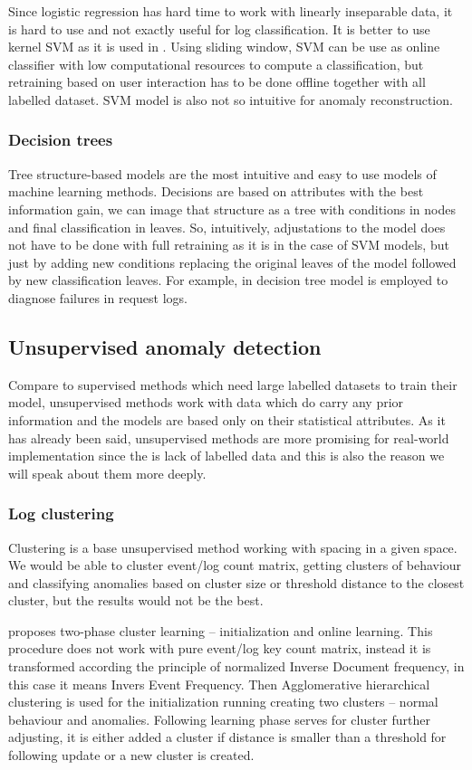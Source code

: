 Since logistic regression has hard time to work with linearly inseparable data, it is hard to use and not exactly useful for log classification. It is better to use kernel SVM as it is used in \cite{liang2007failure}.  Using sliding window, SVM can be use as online classifier with low computational resources to compute a classification, but retraining based on user interaction has to be done offline together with all labelled dataset. SVM model is also not so intuitive for anomaly reconstruction. 
\subsubsection{Decision trees}
Tree structure-based models are the most intuitive and easy to use models of machine learning methods. Decisions are based on attributes with the best information gain, we can image that structure as a tree with conditions in nodes and final classification in leaves. So, intuitively, adjustations to the model does not have to be done with full retraining as it is in the case of SVM models, but just by adding new conditions replacing the original leaves of the model followed by new classification leaves. For example, in \cite{chen2004failure} decision tree model is employed to diagnose failures in request logs.
\subsection{Unsupervised anomaly detection}

Compare to supervised methods which need large labelled datasets to train their model, unsupervised methods work with data which do carry any prior information and the models are based only on their statistical attributes. As it has already been said, unsupervised methods are more promising for real-world implementation since the is lack of labelled data and this is also the reason we will speak about them more deeply. 

\subsubsection{Log clustering}

Clustering is a base unsupervised method working with spacing in a given space. We would be able to cluster event/log count matrix, getting clusters of behaviour and classifying anomalies based on cluster size or threshold distance to the closest cluster, but the results would not be the best.

\cite{lin2016log} proposes two-phase cluster learning – initialization and online learning.  This procedure does not work with pure event/log key count matrix, instead it is transformed according the principle of normalized Inverse Document frequency, in this case it means Invers Event Frequency. Then Agglomerative hierarchical clustering is used for the initialization running creating two clusters – normal behaviour and anomalies. Following learning phase serves for cluster further adjusting, it is either added a cluster if distance is smaller than a threshold for following update or a new cluster is created.

